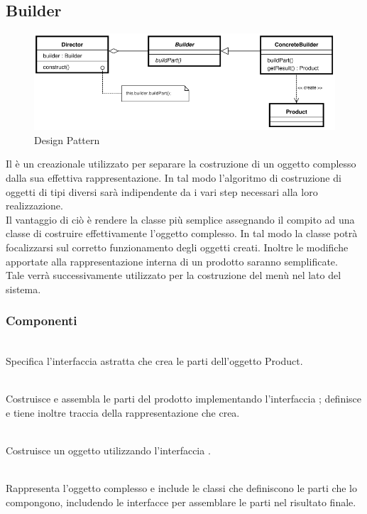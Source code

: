 \documentclass[a4paper, titlepage]{article}
\begin{document}
\subsection{Builder}
\begin{figure}[htp]
\centering
\includegraphics[scale=0.60]{Img/builder.png}
\caption{Design Pattern }
\label{}
\end{figure}
Il  è un  creazionale utilizzato per separare la costruzione di un oggetto complesso dalla sua effettiva rappresentazione. In tal modo l'algoritmo di costruzione di oggetti di tipi diversi sarà indipendente da i vari step necessari alla loro realizzazione.
\\ Il vantaggio di ciò è rendere la classe più semplice assegnando il compito ad una classe  di costruire effettivamente l'oggetto complesso. In tal modo la classe potrà focalizzarsi sul corretto funzionamento degli oggetti creati.
Inoltre le modifiche apportate alla rappresentazione interna di un prodotto saranno semplificate.
\\ Tale  verrà successivamente utilizzato per la costruzione del menù nel lato  del sistema.

\subsubsection{Componenti}
\begin{description}
\item{}
\\ Specifica l'interfaccia astratta che crea le parti dell'oggetto Product.
\item{}
\\Costruisce e assembla le parti del prodotto implementando l'interfaccia ; definisce e tiene inoltre traccia della rappresentazione che crea.
\item{} 
\\Costruisce un oggetto utilizzando l'interfaccia .
\item{}
\\Rappresenta l'oggetto complesso e include le classi che definiscono le parti che lo compongono, includendo le interfacce per assemblare le parti nel risultato finale.
\end{description}
\end{document}
